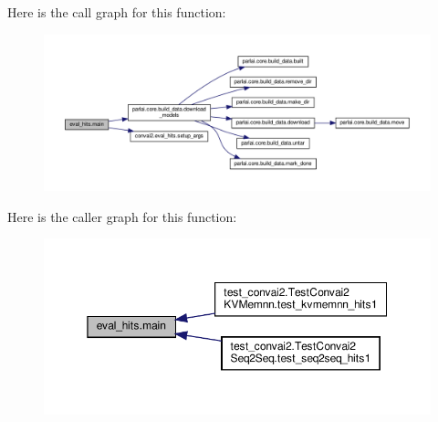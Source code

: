 Here is the call graph for this function\+:
\nopagebreak
\begin{figure}[H]
\begin{center}
\leavevmode
\includegraphics[width=350pt]{namespaceeval__hits_aa050a80858eb66747f1674101554cd1b_cgraph}
\end{center}
\end{figure}
Here is the caller graph for this function\+:
\nopagebreak
\begin{figure}[H]
\begin{center}
\leavevmode
\includegraphics[width=350pt]{namespaceeval__hits_aa050a80858eb66747f1674101554cd1b_icgraph}
\end{center}
\end{figure}
